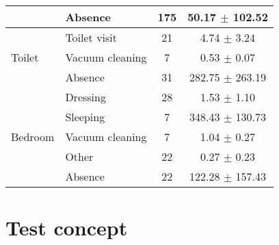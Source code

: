 \begin{table}[htbp]
\begin{tabular}{l|l|c|c}
        & Absence & 175 & 50.17 $\pm$ 102.52 \\
        \midrule[1pt]
        \multirow{3}{*}{Toilet} & Toilet visit & 21 & 4.74 $\pm$ 3.24 \\
        \cline{2-4}
        & Vacuum cleaning & 7 & 0.53 $\pm$ 0.07 \\
        \cline{2-4}
        & Absence & 31 & 282.75 $\pm$ 263.19 \\
        \midrule[1pt]
        \multirow{5}{*}{Bedroom} & Dressing & 28 & 1.53 $\pm$ 1.10 \\
        \cline{2-4}
        & Sleeping & 7 & 348.43 $\pm$ 130.73 \\
        \cline{2-4}
        & Vacuum cleaning & 7 & 1.04 $\pm$ 0.27 \\
        \cline{2-4}
        & Other & 22 & 0.27 $\pm$ 0.23 \\
        \cline{2-4}
        & Absence & 22 & 122.28 $\pm$ 157.43 \\
        \bottomrule
    \end{tabular}
\end{table}

\chapter{Test concept}
\label{app:Test-Concept}

\clearpage
\landscapevalues

